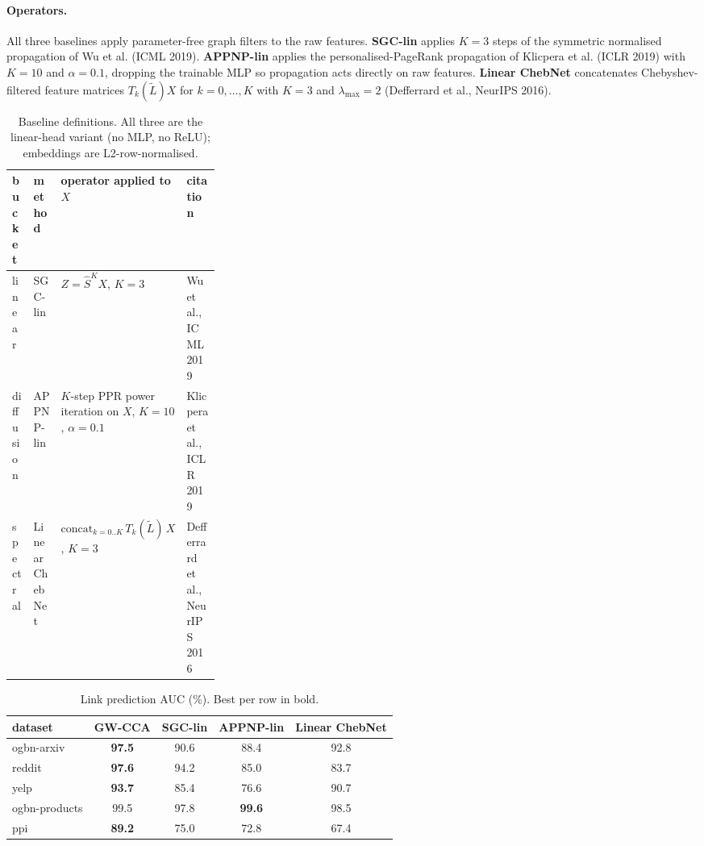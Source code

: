 \documentclass{article}
\begin{document}
\paragraph{Operators.} All three baselines apply parameter-free graph
filters to the raw features. \textbf{SGC-lin} applies $K = 3$ steps of
the symmetric normalised propagation of Wu et al. (ICML 2019).
\textbf{APPNP-lin} applies the personalised-PageRank propagation of
Klicpera et al. (ICLR 2019) with $K = 10$ and $\alpha = 0.1$, dropping
the trainable MLP so propagation acts directly on raw features.
\textbf{Linear ChebNet} concatenates Chebyshev-filtered feature
matrices $T_k(\tilde{L})X$ for $k = 0, \ldots, K$ with $K = 3$ and
$\lambda_{\max} = 2$ (Defferrard et al., NeurIPS 2016).

\begin{table}[!h]
\centering
\small
\caption{Baseline definitions. All three are the linear-head variant
(no MLP, no ReLU); embeddings are L2-row-normalised.}
\label{tab:baseline-def}
\begin{tabular}{l l p{0.30\linewidth} l}
\toprule
bucket & method & operator applied to $X$ & citation \\
\midrule
linear    & SGC-lin        & $Z = \hat{S}^{K} X$, $K = 3$
          & Wu et al., ICML 2019 \\
diffusion & APPNP-lin      & $K$-step PPR power iteration on $X$, $K = 10$, $\alpha = 0.1$
          & Klicpera et al., ICLR 2019 \\
spectral  & Linear ChebNet & $\mathrm{concat}_{k=0..K}\, T_k(\tilde{L})\,X$, $K = 3$
          & Defferrard et al., NeurIPS 2016 \\
\bottomrule
\end{tabular}
\end{table}

\begin{table}[!h]
\centering
\small
\caption{Link prediction AUC (\%). Best per row in bold.}
\label{tab:baselines-lp}
\begin{tabular}{lcccc}
\toprule
dataset & GW-CCA & SGC-lin & APPNP-lin & Linear ChebNet \\
\midrule
ogbn-arxiv    & \textbf{97.5} & 90.6 & 88.4          & 92.8 \\
reddit        & \textbf{97.6} & 94.2 & 85.0          & 83.7 \\
yelp          & \textbf{93.7} & 85.4 & 76.6          & 90.7 \\
ogbn-products & 99.5          & 97.8 & \textbf{99.6} & 98.5 \\
ppi           & \textbf{89.2} & 75.0 & 72.8          & 67.4 \\
\bottomrule
\end{tabular}
\end{table}
\end{document}
